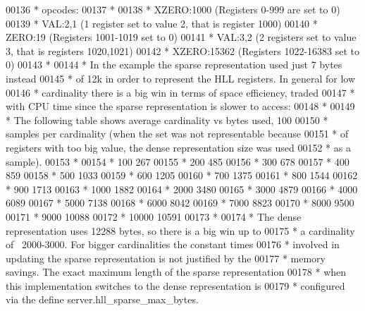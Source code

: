\begin{DoxyCode}
00136 \textcolor{comment}{ * opcodes:}
00137 \textcolor{comment}{ *}
00138 \textcolor{comment}{ * XZERO:1000 (Registers 0-999 are set to 0)}
00139 \textcolor{comment}{ * VAL:2,1    (1 register set to value 2, that is register 1000)}
00140 \textcolor{comment}{ * ZERO:19    (Registers 1001-1019 set to 0)}
00141 \textcolor{comment}{ * VAL:3,2    (2 registers set to value 3, that is registers 1020,1021)}
00142 \textcolor{comment}{ * XZERO:15362 (Registers 1022-16383 set to 0)}
00143 \textcolor{comment}{ *}
00144 \textcolor{comment}{ * In the example the sparse representation used just 7 bytes instead}
00145 \textcolor{comment}{ * of 12k in order to represent the HLL registers. In general for low}
00146 \textcolor{comment}{ * cardinality there is a big win in terms of space efficiency, traded}
00147 \textcolor{comment}{ * with CPU time since the sparse representation is slower to access:}
00148 \textcolor{comment}{ *}
00149 \textcolor{comment}{ * The following table shows average cardinality vs bytes used, 100}
00150 \textcolor{comment}{ * samples per cardinality (when the set was not representable because}
00151 \textcolor{comment}{ * of registers with too big value, the dense representation size was used}
00152 \textcolor{comment}{ * as a sample).}
00153 \textcolor{comment}{ *}
00154 \textcolor{comment}{ * 100 267}
00155 \textcolor{comment}{ * 200 485}
00156 \textcolor{comment}{ * 300 678}
00157 \textcolor{comment}{ * 400 859}
00158 \textcolor{comment}{ * 500 1033}
00159 \textcolor{comment}{ * 600 1205}
00160 \textcolor{comment}{ * 700 1375}
00161 \textcolor{comment}{ * 800 1544}
00162 \textcolor{comment}{ * 900 1713}
00163 \textcolor{comment}{ * 1000 1882}
00164 \textcolor{comment}{ * 2000 3480}
00165 \textcolor{comment}{ * 3000 4879}
00166 \textcolor{comment}{ * 4000 6089}
00167 \textcolor{comment}{ * 5000 7138}
00168 \textcolor{comment}{ * 6000 8042}
00169 \textcolor{comment}{ * 7000 8823}
00170 \textcolor{comment}{ * 8000 9500}
00171 \textcolor{comment}{ * 9000 10088}
00172 \textcolor{comment}{ * 10000 10591}
00173 \textcolor{comment}{ *}
00174 \textcolor{comment}{ * The dense representation uses 12288 bytes, so there is a big win up to}
00175 \textcolor{comment}{ * a cardinality of ~2000-3000. For bigger cardinalities the constant times}
00176 \textcolor{comment}{ * involved in updating the sparse representation is not justified by the}
00177 \textcolor{comment}{ * memory savings. The exact maximum length of the sparse representation}
00178 \textcolor{comment}{ * when this implementation switches to the dense representation is}
00179 \textcolor{comment}{ * configured via the define server.hll\_sparse\_max\_bytes.}

\end{DoxyCode}
